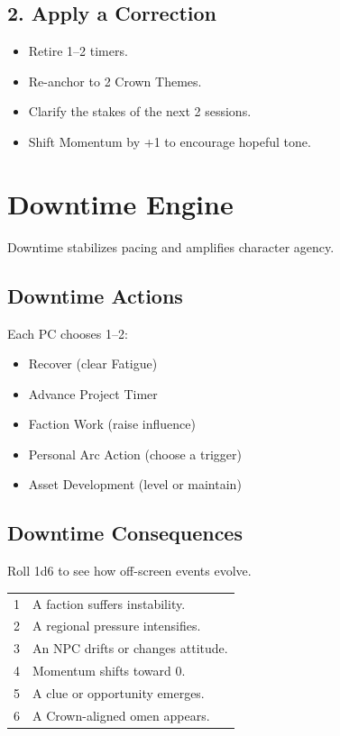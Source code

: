 \documentclass[11pt]{article}
\begin{document}
\subsection{2. Apply a Correction}
\begin{itemize}
    \item Retire 1--2 timers.
    \item Re-anchor to 2 Crown Themes.
    \item Clarify the stakes of the next 2 sessions.
    \item Shift Momentum by +1 to encourage hopeful tone.
\end{itemize}


\section{Downtime Engine}
\label{appendix:downtime}

Downtime stabilizes pacing and amplifies character agency.

\subsection{Downtime Actions}

Each PC chooses 1--2:

\begin{itemize}
    \item Recover (clear Fatigue)
    \item Advance Project Timer 
    \item Faction Work (raise influence)
    \item Personal Arc Action (choose a trigger)
    \item Asset Development (level or maintain)
\end{itemize}

\subsection{Downtime Consequences}

Roll 1d6 to see how off-screen events evolve.

\begin{center}
\begin{longtable}{|c|p{9cm}|}
\hline
1 & A faction suffers instability. \\
2 & A regional pressure intensifies. \\
3 & An NPC drifts or changes attitude. \\
4 & Momentum shifts toward 0. \\
5 & A clue or opportunity emerges. \\
6 & A Crown-aligned omen appears. \\
\hline
\end{longtable}
\end{center}
\end{document}
